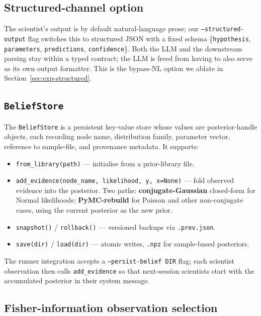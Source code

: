 \documentclass{article}
\begin{document}
\subsection{Structured-channel option}
\label{sec:structured-channel}

The scientist's output is by default natural-language prose; our
\texttt{--structured-output} flag switches this to structured JSON
with a fixed schema \{\texttt{hypothesis}, \texttt{parameters},
\texttt{predictions}, \texttt{confidence}\}. Both the LLM and the
downstream parsing stay within a typed contract; the LLM is freed
from having to also serve as its own output formatter. This is the
bypass-NL option we ablate in Section~\ref{sec:exp-structured}.

\subsection{\texttt{BeliefStore}}
\label{sec:belief-store}

The \texttt{BeliefStore} is a persistent key-value store whose
values are posterior-handle objects, each recording node name,
distribution family, parameter vector, reference to sample-file, and
provenance metadata. It supports:

\begin{itemize}[leftmargin=*, itemsep=0pt]
\item \texttt{from\_library(path)} --- initialise from a prior-library
  file.
\item \texttt{add\_evidence(node\_name, likelihood, y, x=None)}
  --- fold observed evidence into the posterior. Two paths:
  \textbf{conjugate-Gaussian} closed-form for Normal likelihoods;
  \textbf{PyMC-rebuild} for Poisson and other non-conjugate cases,
  using the current posterior as the new prior.
\item \texttt{snapshot()} / \texttt{rollback()} --- versioned
  backups via \texttt{.prev.json}.
\item \texttt{save(dir)} / \texttt{load(dir)} --- atomic writes,
  \texttt{.npz} for sample-based posteriors.
\end{itemize}

The runner integration accepts a \texttt{--persist-belief DIR}
flag; each scientist observation then calls \texttt{add\_evidence}
so that next-session scientists start with the accumulated posterior
in their system message.

\subsection{Fisher-information observation selection}
\label{sec:fisher}
\end{document}
